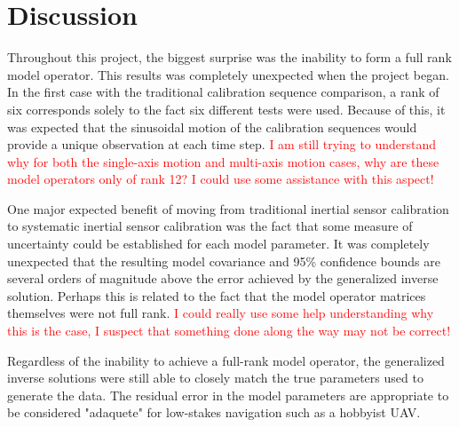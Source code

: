 
\begingroup
\allowdisplaybreaks

\section{Discussion}

Throughout this project, the biggest surprise was the inability to form a full rank model operator. This results was completely unexpected when the project began. In the first case with the traditional calibration sequence comparison, a rank of six corresponds solely to the fact six different tests were used. Because of this, it was expected that the sinusoidal motion of the calibration sequences would provide a unique observation at each time step. \textcolor{red}{I am still trying to understand why for both the single-axis motion and multi-axis motion cases, why are these model operators only of rank 12? I could use some assistance with this aspect!}

One major expected benefit of moving from traditional inertial sensor calibration to systematic inertial sensor calibration was the fact that some measure of uncertainty could be established for each model parameter. It was completely unexpected that the resulting model covariance and 95\% confidence bounds are several orders of magnitude above the error achieved by the generalized inverse solution. Perhaps this is related to the fact that the model operator matrices themselves were not full rank. \textcolor{red}{I could really use some help understanding why this is the case, I suspect that something done along the way may not be correct!}

Regardless of the inability to achieve a full-rank model operator, the generalized inverse solutions were still able to closely match the true parameters used to generate the data. The residual error in the model parameters are appropriate to be considered "adaquete" for low-stakes navigation such as a hobbyist UAV. 

